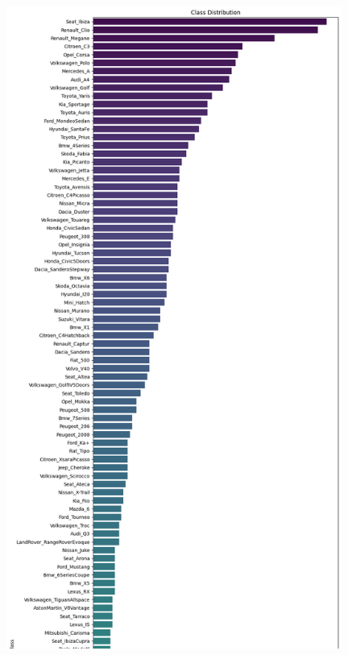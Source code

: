 \begin{figure}
	\centering
	\includegraphics[width=110mm]{img/imbalance-marca-modelo-1.png}
\end{figure}

